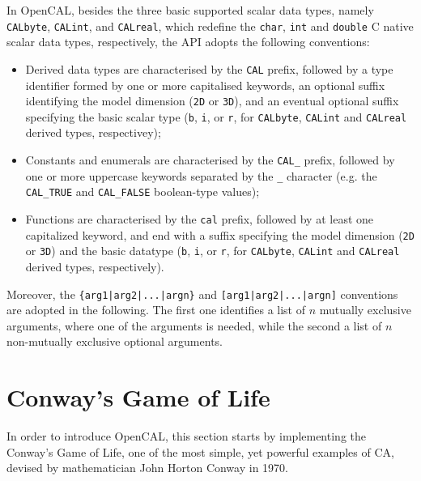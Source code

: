 
  In OpenCAL, besides the three basic supported scalar data types,
  namely \verb'CALbyte', \verb'CALint', and \verb'CALreal', which
  redefine the \verb'char', \verb'int' and \verb'double' C native
  scalar data types, respectively, the API adopts the following
  conventions:
  \begin{itemize}
  \item Derived data types are characterised by the \verb'CAL' prefix,
    followed by a type identifier formed by one or more capitalised
    keywords, an optional suffix identifying the model dimension
    (\verb'2D' or \verb'3D'), and an eventual optional suffix
    specifying the basic scalar type (\verb'b', \verb'i', or \verb'r',
    for \verb'CALbyte', \verb'CALint' and \verb'CALreal' derived
    types, respectivey);
  \item Constants and enumerals are characterised by the \verb'CAL_'
    prefix, followed by one or more uppercase keywords separated by
    the \verb'_' character (e.g. the \verb'CAL_TRUE' and
    \verb'CAL_FALSE' boolean-type values);
  \item Functions are characterised by the \verb'cal' prefix, followed
    by at least one capitalized keyword, and end with a suffix
    specifying the model dimension (\verb'2D' or \verb'3D') and the
    basic datatype (\verb'b', \verb'i', or \verb'r', for
    \verb'CALbyte', \verb'CALint' and \verb'CALreal' derived types,
    respectively).
  \end{itemize}
  Moreover, the \verb'{arg1|arg2|...|argn}' and
  \verb'[arg1|arg2|...|argn]' conventions are adopted in the
  following. The first one identifies a list of $n$ mutually exclusive
  arguments, where one of the arguments is needed, while the second a
  list of $n$ non-mutually exclusive optional arguments.



\section{Conway's Game of Life}\label{sec:cal_life}

In order to introduce OpenCAL, this section starts by implementing the
Conway's Game of Life, one of the most simple, yet powerful examples
of CA, devised by mathematician John Horton Conway in 1970.

